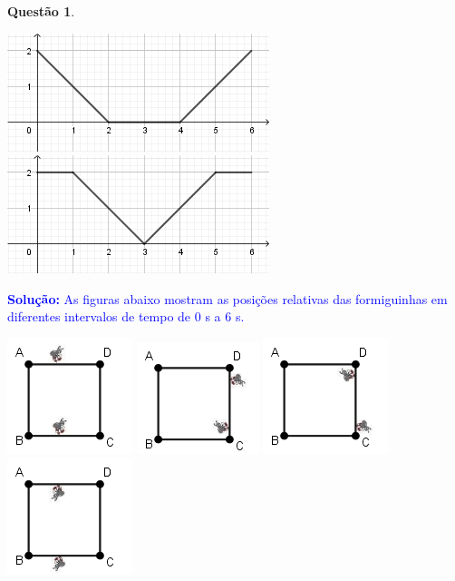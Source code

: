 \documentclass[oneside,a4paper,12pt]{article}
\newcommand{\negrito}[1]{\mbox{\boldmath{$#1$}}}
\theoremstyle{Colorido}
\theoremstyle{solu}
\theoremstyle{dotlessP}
\newtheorem{sol}{Questão}
\begin{document}
\begin{sol}
\begin{tasks}[counter-format={(tsk[a])},label-width=3.6ex, label-format = {\bfseries}, column-sep = {20pt}]
\task[\textcolor{blue}{$\negrito{(d)} $}] \includegraphics[scale=2.9]{Provas e Avaliações/arq-05.png}
\task[\textcolor{blue}{$\negrito{(e)} $}] \includegraphics[scale=2.9]{Provas e Avaliações/arq-06.png}
\end{tasks}
\end{sol}
\textcolor{blue}{\textbf{Solução:}
As figuras abaixo mostram as posições relativas das formiguinhas em diferentes intervalos de tempo de $0$ s a $6$ s.}\newline
\begin{center}
\includegraphics[scale=2.9]{Provas e Avaliações/arq-01 (1).png}
\includegraphics[scale=2.9]{Provas e Avaliações/arq-02 (1).png}
\includegraphics[scale=2.9]{Provas e Avaliações/arq-03 (1).png}
\includegraphics[scale=2.9]{Provas e Avaliações/arq-04 (1).png}
\end{center}
\end{document}
